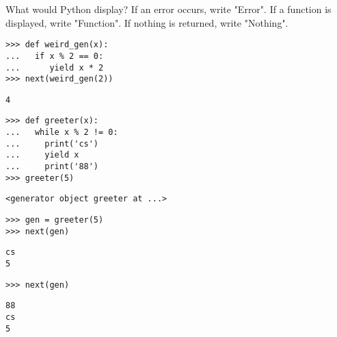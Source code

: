 \begin{blocksection}
\question What would Python display? If an error occurs, write "Error". If a function is displayed, write "Function". If nothing is returned, write "Nothing". 

\begin{lstlisting}
>>> def weird_gen(x):
...   if x % 2 == 0:
...      yield x * 2
>>> next(weird_gen(2))
\end{lstlisting}
\begin{solution}[0.25in]
\begin{lstlisting}
4
\end{lstlisting}
\end{solution}
\end{blocksection}

\begin{lstlisting}
>>> def greeter(x):
...   while x % 2 != 0:
...     print('cs')
...     yield x
...     print('88') 
>>> greeter(5)
\end{lstlisting}
\begin{solution}[0.25in]
\begin{lstlisting}
<generator object greeter at ...>
\end{lstlisting}
\end{solution}

\begin{lstlisting}
>>> gen = greeter(5)
>>> next(gen)
\end{lstlisting}
\begin{solution}[0.25in]
\begin{lstlisting}
cs
5
\end{lstlisting}
\end{solution}

\begin{lstlisting}
>>> next(gen)
\end{lstlisting}
\begin{solution}[0.25in]
\begin{lstlisting}
88
cs
5
\end{lstlisting}
\end{solution}

